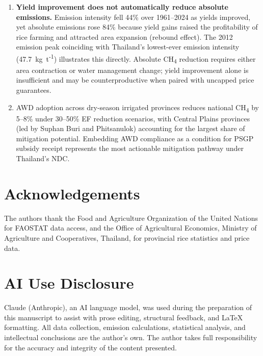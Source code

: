 \documentclass[fleqn,10pt]{olplainarticle}
\begin{document}
\begin{enumerate}[noitemsep]
  \item \textbf{Yield improvement does not automatically reduce absolute emissions.}
        Emission intensity fell 44\% over 1961--2024 as yields improved, yet
        absolute emissions rose 84\% because yield gains raised the profitability
        of rice farming and attracted area expansion (rebound effect).
        The 2012 emission peak coinciding with Thailand's lowest-ever emission
        intensity (47.7~kg~t\textsuperscript{-1}) illustrates this directly.
        Absolute CH\textsubscript{4} reduction requires either area contraction
        or water management change; yield improvement alone is insufficient and
        may be counterproductive when paired with uncapped price guarantees.

  \item AWD adoption across dry-season irrigated provinces reduces national
        CH\textsubscript{4} by 5--8\% under 30--50\% EF reduction scenarios,
        with Central Plains provinces (led by Suphan Buri and Phitsanulok)
        accounting for the largest share of mitigation potential.
        Embedding AWD compliance as a condition for PSGP subsidy receipt
        represents the most actionable mitigation pathway under Thailand's NDC.
\end{enumerate}

\section*{Acknowledgements}

The authors thank the Food and Agriculture Organization of the United Nations
for FAOSTAT data access, and the Office of Agricultural Economics, Ministry of
Agriculture and Cooperatives, Thailand, for provincial rice statistics and
price data.

\section*{AI Use Disclosure}

Claude (Anthropic), an AI language model, was used during the preparation of
this manuscript to assist with prose editing, structural feedback, and LaTeX
formatting.
All data collection, emission calculations, statistical analysis, and
intellectual conclusions are the author's own.
The author takes full responsibility for the accuracy and integrity of the
content presented.
\end{document}
